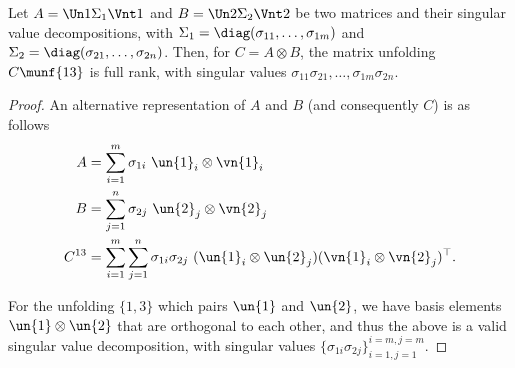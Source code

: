 \begin{lemma}
  \label{lem:tensor-prod}
  Let $A = \Un1 \Sigma_1 \Vnt1$ and $B = \Un2 \Sigma_2 \Vnt2$ be two
  matrices and their singular value decompositions, 
  with $\Sigma_1 = \diag(\sigma_{11}, \ldots, \sigma_{1m})$ and $\Sigma_2
  = \diag(\sigma_{21}, \ldots, \sigma_{2n})$. 
  Then, for $C = A \otimes B$, the matrix unfolding $C\munf{13}$ is full
  rank, with singular values $\sigma_{11} \sigma_{21}, \ldots, \sigma_{1m}
  \sigma_{2n}$.
\end{lemma}
\begin{proof}
  An alternative representation of $A$ and $B$ (and consequently $C$) is as follows
  \begin{align*}
    A &= \sum_{i=1}^m \sigma_{1i}~ \un{1}_i \otimes \vn{1}_i \\
    B &= \sum_{j=1}^n \sigma_{2j}~ \un{2}_j \otimes \vn{2}_j \\
    C^{13} &= \sum_{i=1}^m \sum_{j=1}^n \sigma_{1i} \sigma_{2j}~ (\un{1}_i \otimes \un{2}_j)(\vn{1}_i \otimes \vn{2}_j)^\top.
  \end{align*}

  For the unfolding $\{1,3\}$ which pairs $\un{1}$ and $\un{2}$, we have
basis elements $\un{1} \otimes \un{2}$ that are orthogonal to each
other, and thus the above is a valid singular value decomposition,
with singular values $\{ \sigma_{1i} \sigma_{2j} \}_{i=1,j=1}^{i=m,j=m}$. 
\end{proof}

